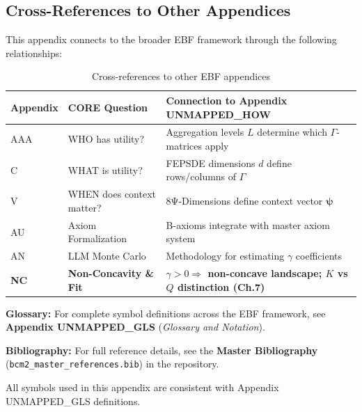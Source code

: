 \subsection{Cross-References to Other Appendices}
\label{sec:B-crossref}

This appendix connects to the broader EBF framework through the following 
relationships:

\begin{table}[h]
\centering
\small
\begin{tabular}{p{2.5cm}p{3cm}p{7cm}}
\toprule
\textbf{Appendix} & \textbf{CORE Question} & \textbf{Connection to Appendix UNMAPPED_HOW} \\
\midrule
AAA & WHO has utility? & Aggregation levels $L$ determine which $\Gamma$-matrices apply \\
C & WHAT is utility? & FEPSDE dimensions $d$ define rows/columns of $\Gamma$ \\
V & WHEN does context matter? & 8Ψ-Dimensions define context vector $\boldsymbol{\psi}$ \\
AU & Axiom Formalization & B-axioms integrate with master axiom system \\
AN & LLM Monte Carlo & Methodology for estimating $\gamma$ coefficients \\
\textbf{NC} & \textbf{Non-Concavity \& Fit} & \textbf{$\gamma > 0 \Rightarrow$ non-concave landscape; $K$ vs $Q$ distinction (Ch.7)} \\
\bottomrule
\end{tabular}
\caption{Cross-references to other EBF appendices}
\label{tab:crossref}
\end{table}





\begin{tcolorbox}[colback=blue!5!white, colframe=blue!75!black, 
    title=\textbf{Central References}]

\textbf{Glossary:} For complete symbol definitions across the EBF framework, 
see \textbf{Appendix UNMAPPED_GLS} (\textit{Glossary and Notation}).

\textbf{Bibliography:} For full reference details, see the 
\textbf{Master Bibliography} (\texttt{bcm2\_master\_references.bib}) 
in the repository.

All symbols used in this appendix are consistent with Appendix UNMAPPED_GLS definitions.

\end{tcolorbox}

